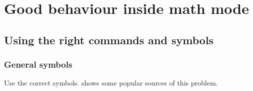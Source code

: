 \chapter{Good behaviour inside math mode}





\section{Using the right commands and symbols}



\subsection{General symbols}

Use the correct symbols.
 shows some popular sources of this problem.
